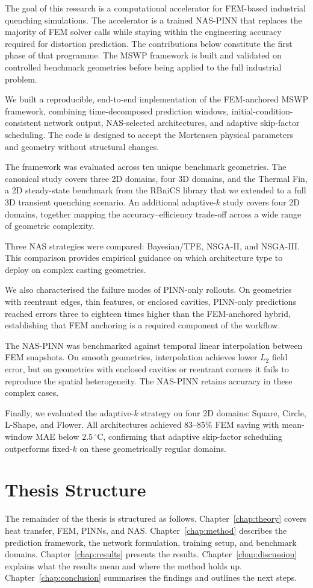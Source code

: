 The goal of this research is a computational accelerator for FEM-based
industrial quenching simulations.
The accelerator is a trained NAS-PINN that replaces the majority of FEM solver
calls while staying within the engineering accuracy required for distortion
prediction.
The contributions below constitute the first phase of that programme.
The MSWP framework is built and validated on controlled benchmark geometries
before being applied to the full industrial problem.

We built a reproducible, end-to-end implementation of the FEM-anchored MSWP
framework, combining time-decomposed prediction windows, initial-condition-consistent
network output, NAS-selected architectures, and adaptive skip-factor scheduling.
The code is designed to accept the Mortensen physical parameters and geometry
without structural changes.

The framework was evaluated across ten unique benchmark geometries.
The canonical study covers three 2D domains, four 3D domains, and the Thermal
Fin, a 2D steady-state benchmark from the RBniCS library that we extended to a
full 3D transient quenching scenario.
An additional adaptive-$k$ study covers four 2D domains, together mapping the
accuracy--efficiency trade-off across a wide range of geometric complexity.

Three NAS strategies were compared: Bayesian/TPE, NSGA-II, and NSGA-III.
This comparison provides empirical guidance on which architecture type to deploy
on complex casting geometries.

We also characterised the failure modes of PINN-only rollouts.
On geometries with reentrant edges, thin features, or enclosed cavities,
PINN-only predictions reached errors three to eighteen times higher than the
FEM-anchored hybrid, establishing that FEM anchoring is a required component
of the workflow.

The NAS-PINN was benchmarked against temporal linear interpolation between FEM
snapshots.
On smooth geometries, interpolation achieves lower $L_2$ field error, but on
geometries with enclosed cavities or reentrant corners it fails to reproduce
the spatial heterogeneity.
The NAS-PINN retains accuracy in these complex cases.

Finally, we evaluated the adaptive-$k$ strategy on four 2D domains: Square,
Circle, L-Shape, and Flower.
All architectures achieved 83--85\% FEM saving with mean-window MAE below
$2.5\,^\circ\mathrm{C}$, confirming that adaptive skip-factor scheduling
outperforms fixed-$k$ on these geometrically regular domains.

\section{Thesis Structure}

The remainder of the thesis is structured as follows.
Chapter~\ref{chap:theory} covers heat transfer, FEM, PINNs, and NAS.
Chapter~\ref{chap:method} describes the prediction framework, the network
formulation, training setup, and benchmark domains.
Chapter~\ref{chap:results} presents the results.
Chapter~\ref{chap:discussion} explains what the results mean and where the
method holds up.
Chapter~\ref{chap:conclusion} summarises the findings and outlines the next
steps.
